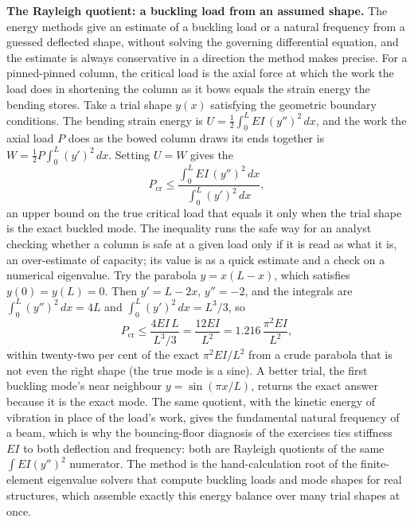 \begin{mastery}
\textbf{The Rayleigh quotient: a buckling load from an assumed shape.} The
energy methods give an estimate of a buckling load or a natural frequency
from a guessed deflected shape, without solving the governing differential
equation, and the estimate is always conservative in a direction the
method makes precise. For a pinned-pinned column, the critical load is the
axial force at which the work the load does in shortening the column as it
bows equals the strain energy the bending stores. Take a trial shape
$y(x)$ satisfying the geometric boundary conditions. The bending strain
energy is $U=\tfrac12\int_0^L EI\,(y'')^2\,dx$, and the work the axial load
$P$ does as the bowed column draws its ends together is $W=\tfrac12 P
\int_0^L (y')^2\,dx$. Setting $U=W$ gives the 
\[
P_{\text{cr}} \le \frac{\int_0^L EI\,(y'')^2\,dx}{\int_0^L (y')^2\,dx},
\]
an upper bound on the true critical load that equals it only when the trial
shape is the exact buckled mode. The inequality runs the safe way for an
analyst checking whether a column is safe at a given load only if it is
read as what it is, an over-estimate of capacity; its value is as a quick
estimate and a check on a numerical eigenvalue. Try the parabola
$y=x(L-x)$, which satisfies $y(0)=y(L)=0$. Then $y'=L-2x$, $y''=-2$, and
the integrals are $\int_0^L (y'')^2\,dx = 4L$ and $\int_0^L (y')^2\,dx =
L^3/3$, so
\[
P_{\text{cr}} \le \frac{4 EI\,L}{L^3/3} = \frac{12 EI}{L^2}
= 1.216\,\frac{\pi^2 EI}{L^2},
\]
within twenty-two per cent of the exact $\pi^2 EI/L^2$ from a crude
parabola that is not even the right shape (the true mode is a sine). A
better trial, the first buckling mode's near neighbour $y=\sin(\pi x/L)$,
returns the exact answer because it is the exact mode. The same quotient,
with the kinetic energy of vibration in place of the load's work, gives the
fundamental natural frequency of a beam, which is why the bouncing-floor
diagnosis of the exercises ties stiffness $EI$ to both deflection and
frequency: both are Rayleigh quotients of the same $\int EI(y'')^2$
numerator. The method is the hand-calculation root of the finite-element
eigenvalue solvers that compute buckling loads and mode shapes for real
structures, which assemble exactly this energy balance over many trial
shapes at once.
\end{mastery}

